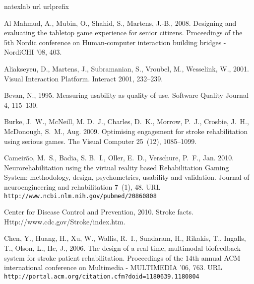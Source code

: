 \documentclass[preprint,authoryear,12pt]{elsarticle}
\begin{document}
\begin{thebibliography}{40}
\expandafter\ifx\csname natexlab\endcsname\relax\def\natexlab#1{#1}\fi
\expandafter\ifx\csname url\endcsname\relax
  \def\url#1{\texttt{#1}}\fi
\expandafter\ifx\csname urlprefix\endcsname\relax\def\urlprefix{URL }\fi

{Al Mahmud}, A., Mubin, O., Shahid, S., Martens, J.-B., 2008. {Designing and
  evaluating the tabletop game experience for senior citizens}. Proceedings of
  the 5th Nordic conference on Human-computer interaction building bridges -
  NordiCHI '08, 403.

Aliakseyeu, D., Martens, J., Subramanian, S., Vroubel, M., Wesselink, W., 2001.
  {Visual Interaction Platform}. Interact 2001, 232--239.

Bevan, N., 1995. Measuring usability as quality of use. Software Quality
  Journal 4, 115--130.

Burke, J.~W., McNeill, M. D.~J., Charles, D.~K., Morrow, P.~J., Crosbie, J.~H.,
  McDonough, S.~M., Aug. 2009. {Optimising engagement for stroke rehabilitation
  using serious games}. The Visual Computer 25~(12), 1085--1099.

Cameir\~{a}o, M.~S., Badia, S. B.~I., Oller, E.~D., Verschure, P.~F., Jan.
  2010. {Neurorehabilitation using the virtual reality based Rehabilitation
  Gaming System: methodology, design, psychometrics, usability and validation.}
  Journal of neuroengineering and rehabilitation 7~(1), 48.
\newline\urlprefix\url{http://www.ncbi.nlm.nih.gov/pubmed/20860808}

{Center for Disease Control and Prevention}, 2010. Stroke facts.
  Http://www.cdc.gov/Stroke/index.htm.

Chen, Y., Huang, H., Xu, W., Wallis, R.~I., Sundaram, H., Rikakis, T., Ingalls,
  T., Olson, L., He, J., 2006. {The design of a real-time, multimodal
  biofeedback system for stroke patient rehabilitation}. Proceedings of the
  14th annual ACM international conference on Multimedia - MULTIMEDIA '06, 763.
\newline\urlprefix\url{http://portal.acm.org/citation.cfm?doid=1180639.1180804}


\end{thebibliography}
\end{document}
